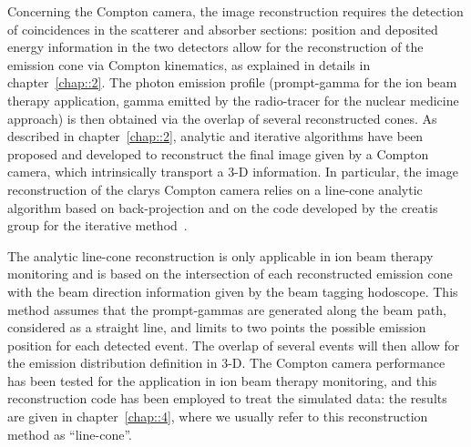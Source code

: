 Concerning the Compton camera, the image reconstruction requires the detection of coincidences in the scatterer and absorber sections: position and deposited energy information in the two detectors allow for the reconstruction of the emission cone via Compton kinematics, as explained in details in chapter~\ref{chap::2}. The photon emission profile (prompt-gamma for the ion beam therapy application, gamma emitted by the radio-tracer for the nuclear medicine approach) is then obtained via the overlap of several reconstructed cones. As described in chapter~\ref{chap::2}, analytic and iterative algorithms have been proposed and developed to reconstruct the final image given by a Compton camera, which intrinsically transport a 3-D information. In particular, the image reconstruction of the \gls{clarys} Compton camera relies on a line-cone analytic algorithm based on back-projection and on the code developed by the \gls{creatis} group for the iterative method~\parencite{Lojacono2013, Maxim2014, Hilaire2014}.

The analytic line-cone reconstruction is only applicable in ion beam therapy monitoring and is based on the intersection of each reconstructed emission cone with the beam direction information given by the beam tagging hodoscope. This method assumes that the prompt-gammas are generated along the beam path, considered as a straight line, and limits to two points the possible emission position for each detected event. The overlap of several events will then allow for the emission distribution definition in 3-D. The Compton camera performance has been tested for the application in ion beam therapy monitoring, and this reconstruction code has been employed to treat the simulated data: the results are given in chapter~\ref{chap::4}, where we usually refer to this reconstruction method as \enquote{line-cone}.

